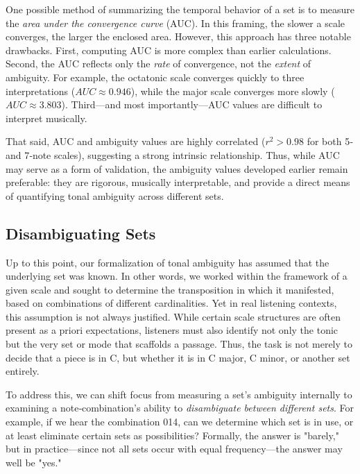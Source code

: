 \documentclass[10pt,twocolumn]{article}
\numberwithin{equation}{section} %
\begin{document}
    One possible method of summarizing the temporal behavior of a set is to measure the \textit{area under the convergence curve} (AUC).
    In this framing, the slower a scale converges, the larger the enclosed area.
    However, this approach has three notable drawbacks.
    First, computing AUC is more complex than earlier calculations.
    Second, the AUC reflects only the \textit{rate} of convergence, not the \textit{extent} of ambiguity.
    For example, the octatonic scale converges quickly to three interpretations ($AUC \approx 0.946$), while the major scale converges more slowly ($AUC \approx 3.803$).
    Third—and most importantly—AUC values are difficult to interpret musically.

    That said, AUC and ambiguity values are highly correlated ($r^2 > 0.98$ for both 5‑ and 7‑note scales), suggesting a strong intrinsic relationship.
    Thus, while AUC may serve as a form of validation, the ambiguity values developed earlier remain preferable: they are rigorous, musically interpretable, and provide a direct means of quantifying tonal ambiguity across different sets.

    \subsection{Disambiguating Sets}

    Up to this point, our formalization of tonal ambiguity has assumed that the underlying set was known.
    In other words, we worked within the framework of a given scale and sought to determine the transposition in which it manifested, based on combinations of different cardinalities.
    Yet in real listening contexts, this assumption is not always justified.
    While certain scale structures are often present as a priori expectations\citep{Krumhansl1979}, listeners must also identify not only the tonic but the very set or mode that scaffolds a passage.
    Thus, the task is not merely to decide that a piece is in C, but whether it is in C major, C minor, or another set entirely.

    To address this, we can shift focus from measuring a set's ambiguity internally to examining a note‑combination's ability to \textit{disambiguate between different sets}.
    For example, if we hear the combination 014, can we determine which set is in use, or at least eliminate certain sets as possibilities?
    Formally, the answer is "barely," but in practice—since not all sets occur with equal frequency—the answer may well be "yes."
\end{document}
